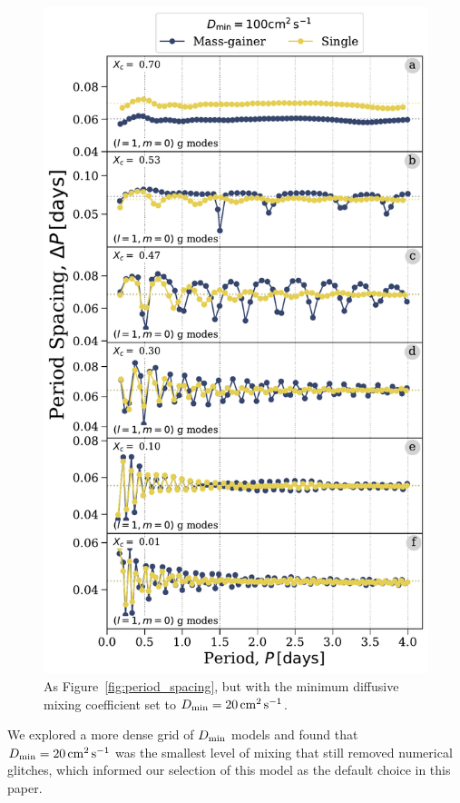 \documentclass[desactivate]{aa}
\begin{document}
\begin{figure}[bt]
    \centering
    \includegraphics[width=\columnwidth]{figures/period_spacing_mdm100.pdf}
    \caption{As Figure~\ref{fig:period_spacing}, but with the minimum diffusive mixing coefficient set to $D_{\rm min} = 20 \,{\rm cm^2 \, s^{-1}}$.}
    \label{fig:period_spacing_mdm100}
\end{figure}

We explored a more dense grid of $D_{\rm min}$ models and found that $D_{\rm min} = 20 \,{\rm cm^2 \, s^{-1}}$ was the smallest level of mixing that still removed numerical glitches, which informed our selection of this model as the default choice in this paper.
\end{document}
